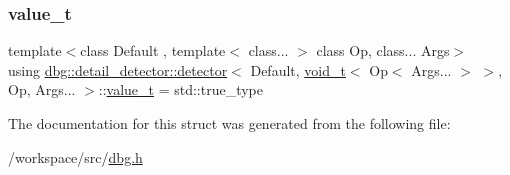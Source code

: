 \subsubsection{\texorpdfstring{value\+\_\+t}{value\_t}}
{\footnotesize\ttfamily template$<$class Default , template$<$ class... $>$ class Op, class... Args$>$ \\
using \hyperlink{structdbg_1_1detail__detector_1_1detector}{dbg\+::detail\+\_\+detector\+::detector}$<$ Default, \hyperlink{namespacedbg_1_1detail__detector_a1dbadccf461338e71c55ea392d4ed47c}{void\+\_\+t}$<$ Op$<$ Args... $>$ $>$, Op, Args... $>$\+::\hyperlink{structdbg_1_1detail__detector_1_1detector_3_01_default_00_01void__t_3_01_op_3_01_args_8_8_8_01_4b82e02bb2aa06b0130d0ab9c715e6bdd_ab9dc20c0565be267d2d98b0e0f4a565b}{value\+\_\+t} =  std\+::true\+\_\+type}



The documentation for this struct was generated from the following file\+:\begin{DoxyCompactItemize}
\item 
/workspace/src/\hyperlink{dbg_8h}{dbg.\+h}\end{DoxyCompactItemize}

